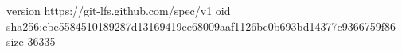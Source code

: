 version https://git-lfs.github.com/spec/v1
oid sha256:ebe5584510189287d13169419ee68009aaf1126bc0b693bd14377c9366759f86
size 36335
